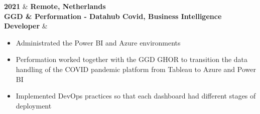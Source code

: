 \textbf{2021} & \textbf{Remote, Netherlands} \\
\textbf{GGD \& Performation - Datahub Covid, Business Intelligence Developer} & 
\begin{itemize}[leftmargin=0.5cm,itemsep=0pt,parsep=0pt]
\item Administrated the Power BI and Azure environments
\item Performation worked together with the GGD GHOR to transition the data handling of the COVID pandemic platform from Tableau to Azure and Power BI
\item Implemented DevOps practices so that each dashboard had different stages of deployment
\end{itemize} \\ 